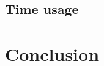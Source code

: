 \documentclass{emulateapj}
\begin{document}
\subsection{Time usage}

\section{Conclusion}



%
\end{document}
